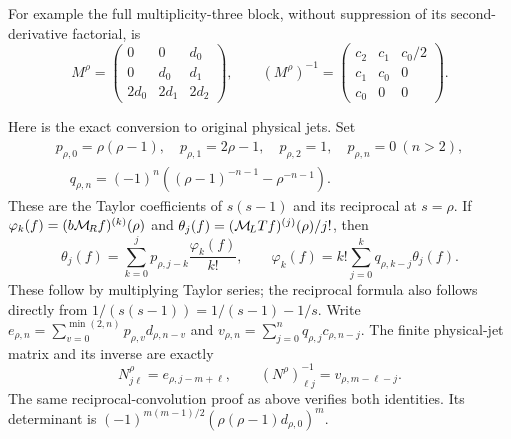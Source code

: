 \documentclass[11pt]{article}
\begin{document}
For example the full multiplicity-three block, without suppression
of its second-derivative factorial, is
\[
 M^\rho=\begin{pmatrix}0&0&d_0\\0&d_0&d_1\\
                         2d_0&2d_1&2d_2\end{pmatrix},\qquad
 (M^\rho)^{-1}=\begin{pmatrix}c_2&c_1&c_0/2\\
                           c_1&c_0&0\\c_0&0&0\end{pmatrix}.
\]

Here is the exact conversion to original physical jets. Set
\begin{equation}\label{mburn:eq:pq}
 \begin{gathered}
 p_{\rho,0}=\rho(\rho-1),\quad p_{\rho,1}=2\rho-1,
 \quad p_{\rho,2}=1,\quad p_{\rho,n}=0\ (n>2),\\
 \quad q_{\rho,n}=(-1)^n\left((\rho-1)^{-n-1}-\rho^{-n-1}\right).
 \end{gathered}
\end{equation}
These are the Taylor coefficients of $s(s-1)$ and its reciprocal
at $s=\rho$. If $\varphi_k(f)=(b\mathcal M_{\!R} f)^{(k)}(\rho)$ and
$\theta_j(f)=(\mathcal M_{\!L} Tf)^{(j)}(\rho)/j!$, then
\begin{equation}\label{mburn:eq:jet-conversion}
 \theta_j(f)=\sum_{k=0}^j p_{\rho,j-k}\frac{\varphi_k(f)}{k!},
 \qquad
 \varphi_k(f)=k!\sum_{j=0}^kq_{\rho,k-j}\theta_j(f).
\end{equation}
These follow by multiplying Taylor series; the reciprocal formula
also follows directly from
$1/(s(s-1))=1/(s-1)-1/s$.
Write $e_{\rho,n}=\sum_{v=0}^{\min(2,n)}p_{\rho,v}d_{\rho,n-v}$
and $v_{\rho,n}=\sum_{j=0}^nq_{\rho,j}c_{\rho,n-j}$.
The finite physical-jet matrix and its inverse are exactly
\begin{equation}\label{mburn:eq:physical-jet}
 N^\rho_{j\ell}=e_{\rho,j-m+\ell},\qquad
 (N^\rho)^{-1}_{\ell j}=v_{\rho,m-\ell-j}.
\end{equation}
The same reciprocal-convolution proof as above verifies both
identities. Its determinant is
$(-1)^{m(m-1)/2}(\rho(\rho-1)d_{\rho,0})^m$.
\end{document}
